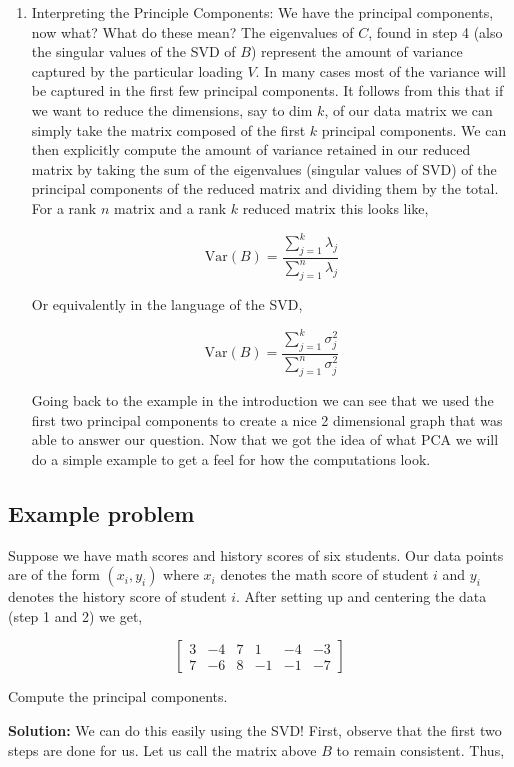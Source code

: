 \documentclass{article}
\begin{document}
\begin{enumerate}
\item Interpreting the Principle Components: We have the principal components, now what? What do these mean? The eigenvalues of $C$, found in step 4 (also the singular values of the SVD of $B$) represent the amount of variance captured by the particular loading $V$. In many cases most of the variance will be captured in the first few principal components. It follows from this that if we want to reduce the dimensions, say to dim $k$, of our data matrix we can simply take the matrix composed of the first $k$ principal components. We can then explicitly compute the amount of variance retained in our reduced matrix by taking the sum of the eigenvalues (singular values of SVD) of the principal components of the reduced matrix and dividing them by the total. For a rank $n$ matrix and a rank $k$ reduced matrix this looks like,

$$\text{Var}(B)=\frac{\sum_{j=1}^{k}\lambda_j}{\sum_{j=1}^{n}\lambda_j}$$

Or equivalently in the language of the SVD,

$$\text{Var}(B)=\frac{\sum_{j=1}^{k}\sigma^2_j}{\sum_{j=1}^{n}\sigma^2_j}$$


Going back to the example in the introduction we can see that we used the first two principal components to create a nice 2 dimensional graph that was able to answer our question. Now that we got the idea of what PCA we will do a simple example to get a feel for how the computations look.
\end{enumerate}

\subsection{Example problem}
Suppose we have math scores and history scores of six students. Our data points are of the form $(x_i,y_i)$ where $x_i$ denotes the math score of student $i$ and $y_i$ denotes the
history score of student $i$. After setting up and centering the data (step 1 and 2) we get,

$$\begin{bmatrix}
3& -4& 7& 1& -4& -3\\
7& -6& 8& -1& -1& -7
\end{bmatrix}$$

\noindent Compute the principal components.

\bigskip

\textbf{Solution:} We can do this easily using the SVD! First, observe that the first two steps are done for us. Let us call the matrix above $B$ to remain consistent. Thus,
\end{document}
